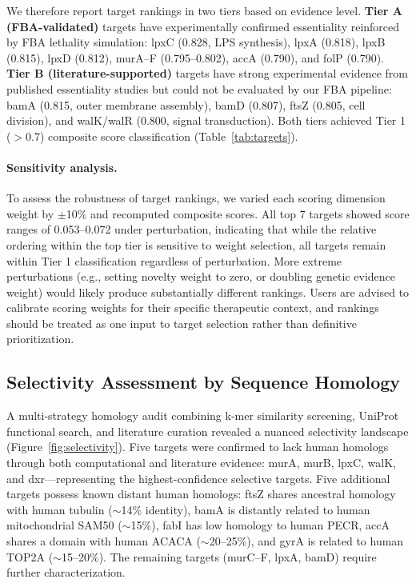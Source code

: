 \documentclass[12pt,a4paper]{article}
\begin{document}
We therefore report target rankings in two tiers based on evidence level. \textbf{Tier A (FBA-validated)} targets have experimentally confirmed essentiality reinforced by FBA lethality simulation: lpxC (0.828, LPS synthesis), lpxA (0.818), lpxB (0.815), lpxD (0.812), murA--F (0.795--0.802), accA (0.790), and folP (0.790). \textbf{Tier B (literature-supported)} targets have strong experimental evidence from published essentiality studies but could not be evaluated by our FBA pipeline: bamA (0.815, outer membrane assembly), bamD (0.807), ftsZ (0.805, cell division), and walK/walR (0.800, signal transduction). Both tiers achieved Tier 1 ($>$0.7) composite score classification (Table~\ref{tab:targets}).

\paragraph{Sensitivity analysis.} To assess the robustness of target rankings, we varied each scoring dimension weight by $\pm$10\% and recomputed composite scores. All top 7 targets showed score ranges of 0.053--0.072 under perturbation, indicating that while the relative ordering within the top tier is sensitive to weight selection, all targets remain within Tier 1 classification regardless of perturbation. More extreme perturbations (e.g., setting novelty weight to zero, or doubling genetic evidence weight) would likely produce substantially different rankings. Users are advised to calibrate scoring weights for their specific therapeutic context, and rankings should be treated as one input to target selection rather than definitive prioritization.

\subsection{Selectivity Assessment by Sequence Homology}
A multi-strategy homology audit combining k-mer similarity screening, UniProt functional search, and literature curation revealed a nuanced selectivity landscape (Figure~\ref{fig:selectivity}). Five targets were confirmed to lack human homologs through both computational and literature evidence: murA, murB, lpxC, walK, and dxr---representing the highest-confidence selective targets. Five additional targets possess known distant human homologs: ftsZ shares ancestral homology with human tubulin ($\sim$14\% identity), bamA is distantly related to human mitochondrial SAM50 ($\sim$15\%), fabI has low homology to human PECR, accA shares a domain with human ACACA ($\sim$20--25\%), and gyrA is related to human TOP2A ($\sim$15--20\%). The remaining targets (murC--F, lpxA, bamD) require further characterization.
\end{document}
